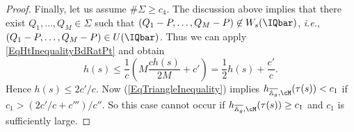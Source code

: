 \begin{proof}
Finally, let us assume $\#\Sigma \ge c_4$. %
The discussion above implies
that there exist $Q_1,\ldots,Q_M \in
\Sigma$ such that $(Q_1 - P, \ldots, Q_M-P) \not\in
W_s(\IQbar)$, \textit{i.e.}, $(Q_1 - P, \ldots, Q_M-P)\in U(\IQbar)$.
Thus we can apply \eqref{EqHtInequalityBdRatPt} and obtain
\begin{equation*}
  h(s) \le \frac{1}{c }\left( M\frac{c h(s)}{2M}
    +c' \right) = \frac{1}{2} h(s) + \frac{c'}{c}.
\end{equation*}
Hence
$h(s)\le  2c'/c$. Now (\ref{EqTriangleInequality}) implies
$h_{\overline{\mathbb{A}_g},\cM}(\tau(s)) < c_1$ if $c_1 >
(2c'/c+c''')/c''$.
So this case cannot occur if
$h_{\overline{\mathbb{A}_g},\cM}(\tau(s)) \ge c_1$ and $c_1$ is
sufficiently large.
\end{proof}



